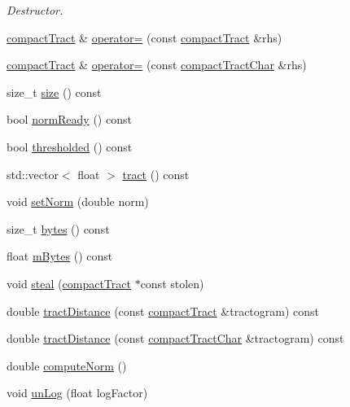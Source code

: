 \begin{DoxyCompactItemize}
\begin{DoxyCompactList}\small\item\em \-Destructor. \end{DoxyCompactList}\item 
\hyperlink{classcompactTract}{compact\-Tract} \& \hyperlink{classcompactTract_ad7b298edef870a8f3e4a5091f8b99f45}{operator=} (const \hyperlink{classcompactTract}{compact\-Tract} \&rhs)
\item 
\hyperlink{classcompactTract}{compact\-Tract} \& \hyperlink{classcompactTract_aa985da724455a58222be6f5f39a02dfa}{operator=} (const \hyperlink{classcompactTractChar}{compact\-Tract\-Char} \&rhs)
\item 
size\-\_\-t \hyperlink{classcompactTract_a744d11a1c2273b6d18196af7a9b9a55f}{size} () const 
\item 
bool \hyperlink{classcompactTract_a2dfc44d4f3c1b18e7882a55482eca2a0}{norm\-Ready} () const 
\item 
bool \hyperlink{classcompactTract_aa430d6306d12eff3be9d9e97bfe592d8}{thresholded} () const 
\item 
std\-::vector$<$ float $>$ \hyperlink{classcompactTract_a3f4530bf1e1f7c66a93fbdcaabc297be}{tract} () const 
\item 
void \hyperlink{classcompactTract_afedb5432b159636e99491b0d2c0a5a57}{set\-Norm} (double norm)
\item 
size\-\_\-t \hyperlink{classcompactTract_a373213a2170988f02d8e7e4ef401e70c}{bytes} () const 
\item 
float \hyperlink{classcompactTract_ab295ffbd32780bdc2401824e82999c9a}{m\-Bytes} () const 
\item 
void \hyperlink{classcompactTract_ad9d98adcd6cd017fe705dbf834cd0e02}{steal} (\hyperlink{classcompactTract}{compact\-Tract} $\ast$const stolen)
\item 
double \hyperlink{classcompactTract_ab3d1a2da0c12374252e4300c5ec2cf06}{tract\-Distance} (const \hyperlink{classcompactTract}{compact\-Tract} \&tractogram) const 
\item 
double \hyperlink{classcompactTract_a65ab358c76dd77bc8db7525daec85013}{tract\-Distance} (const \hyperlink{classcompactTractChar}{compact\-Tract\-Char} \&tractogram) const 
\item 
double \hyperlink{classcompactTract_a5292a6afd40d42e3686e9beb9d621fd5}{compute\-Norm} ()
\item 
void \hyperlink{classcompactTract_a17a59a2cdd6ed1040314ee4998b84f99}{un\-Log} (float log\-Factor)
\item 

\end{DoxyCompactItemize}
